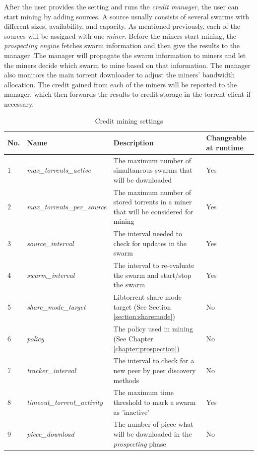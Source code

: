 After the user provides the setting and runs the \textit{credit manager}, the user can start mining by adding sources. A source usually consists of several swarms with different sizes, availability, and capacity. As mentioned previously, each of the sources will be assigned with one \textit{miner}. Before the miners start mining, the \textit{prospecting engine} fetches swarm information and then give the results to the manager .The manager will propagate the swarm information to miners and let the miners decide which swarm to mine based on that information. The manager also monitors the main torrent downloader to adjust the miners' bandwidth allocation. The credit gained from each of the miners will be reported to the manager, which then forwards the results to credit storage in the torrent client if necessary.

\begin{table}[h]
	\centering
	\caption{Credit mining settings}
	\label{tbl:cmsettings}
	\begin{adjustwidth}{-1.5cm}{}
	\begin{tabular}{|p{1cm}|p{4cm}|p{7cm}|p{2cm}|}
		\hline
		\rowcolor[HTML]{EFEFEF} 
		No. & Name & Description & Changeable at runtime \\ \hline
	1 & \textit{max\_torrents\_active} & The maximum number of simultaneous swarms that will be downloaded & Yes \\ \hline
	2 & \textit{max\_torrents\_per\_source} & The maximum number of stored torrents in a miner that will be considered for mining & Yes \\ \hline
	3 & \textit{source\_interval} & The interval needed to check for updates in the swarm & Yes \\ \hline
	4 & \textit{swarm\_interval} & The interval to re-evaluate the swarm and start/stop the swarm & Yes \\ \hline
	5 & \textit{share\_mode\_target} & Libtorrent share mode target (See Section \ref{section:sharemode}) & No \\ \hline
	6 & \textit{policy} & The policy used in mining (See Chapter \ref{chapter:prospection}) & No \\ \hline
	7 & \textit{tracker\_interval} & The interval to check for a new peer by peer discovery methods & No \\ \hline
	8 & \textit{timeout\_torrent\_activity} & The maximum time threshold to mark a swarm as 'inactive' & Yes \\ \hline
	9 & \textit{piece\_download} & The number of piece what will be downloaded in the \textit{prospecting} phase & No \\ \hline
	\end{tabular}
	\end{adjustwidth}
\end{table}



